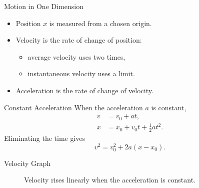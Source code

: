 \documentclass{beamer}
\begin{document}
\begin{frame}{Motion in One Dimension}
  \begin{itemize}
    \item Position $x$ is measured from a chosen origin.
    \item Velocity is the rate of change of position:
    \begin{itemize}
      \item average velocity uses two times,
      \item instantaneous velocity uses a limit.
    \end{itemize}
    \item Acceleration is the rate of change of velocity.
  \end{itemize}
\end{frame}

\begin{frame}{Constant Acceleration}
  When the acceleration $a$ is constant,
  \begin{align*}
    v &= v_0 + a t, \\
    x &= x_0 + v_0 t + \tfrac{1}{2} a t^2 .
  \end{align*}
  Eliminating the time gives
  \begin{equation*}
    v^2 = v_0^2 + 2 a \left(x - x_0\right).
  \end{equation*}
\end{frame}

\begin{frame}{Velocity Graph}
  \begin{figure}
    \centering
    \caption{Velocity rises linearly when the acceleration is constant.}
  \end{figure}
\end{frame}
\end{document}
